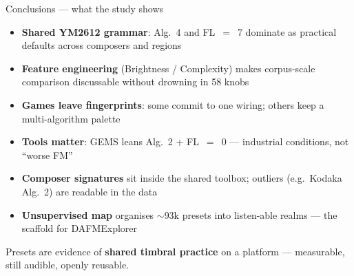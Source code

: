 \documentclass[aspectratio=169,11pt]{beamer}
\begin{document}
\begin{frame}{Conclusions --- what the study shows}
  {\scriptsize
  \begin{itemize}
    \item \textbf{Shared YM2612 grammar}: Alg.~4 and FL~$=$~7 dominate as practical defaults across composers and regions
    \item \textbf{Feature engineering} (Brightness / Complexity) makes corpus-scale comparison discussable without drowning in 58 knobs
    \item \textbf{Games leave fingerprints}: some commit to one wiring; others keep a multi-algorithm palette
    \item \textbf{Tools matter}: GEMS leans Alg.~2 + FL~$=$~0 --- industrial conditions, not ``worse FM''
    \item \textbf{Composer signatures} sit inside the shared toolbox; outliers (e.g.\ Kodaka Alg.~2) are readable in the data
    \item \textbf{Unsupervised map} organises $\sim$93k presets into listen-able realms --- the scaffold for DAFMExplorer
  \end{itemize}
  \vspace{1.5mm}
  {\small Presets are evidence of \textbf{shared timbral practice} on a platform --- measurable, still audible, openly reusable.}
  }
\end{frame}
\end{document}

